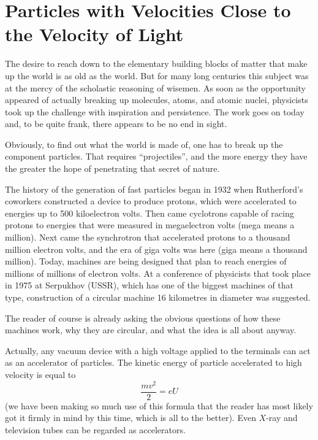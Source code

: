 \section[Particles Close to the Velocity of Light]{Particles with Velocities Close to\\ the Velocity of Light}

The desire to reach down to the elementary building blocks of matter that make up the world is as old as the world. But for many long centuries this subject was at the mercy of the scholastic reasoning of wisemen. As soon as the opportunity appeared of actually breaking up mol­ecules, atoms, and atomic nuclei, physicists took up the challenge with inspiration and persistence. The work goes on today and, to be quite frank, there appears to be no end in sight.

Obviously, to find out what the world is made of, one has to break up the component particles. That requires ``projectiles'', and the more energy they have the greater the hope of penetrating that secret of nature.

The history of the generation of fast particles began in 1932 when Rutherford's coworkers constructed a device to produce protons, which were accelerated to ener­gies up to 500 kiloelectron volts. Then came cyclotrons capable of racing protons to energies that were measured in megaelectron volts (mega means a million). Next came the synchrotron that accelerated protons to a thousand million electron volts, and the era of giga volts was here (giga means a thousand million). Today, machines are being designed that plan to reach energies of millions of millions of electron volts. At a conference of physicists that took place in 1975 at Serpukhov (USSR), which has one of the biggest machines of that type, construction of a circular machine 16 kilometres in diameter was suggest­ed.

The reader of course is already asking the obvious questions of how these machines work, why they are cir­cular, and what the idea is all about anyway.

Actually, any vacuum device with a high voltage ap­plied to the terminals can act as an accelerator of particles. The kinetic energy of particle accelerated to high velocity is equal to 
\begin{equation*}%
\frac{mv^{2}}{2} = eU
\end{equation*}
(we have been making so much use of this formula that the reader has most likely got it firmly in mind by this time, which is all to the better). Even $X$-ray and televi­sion tubes can be regarded as accelerators.

